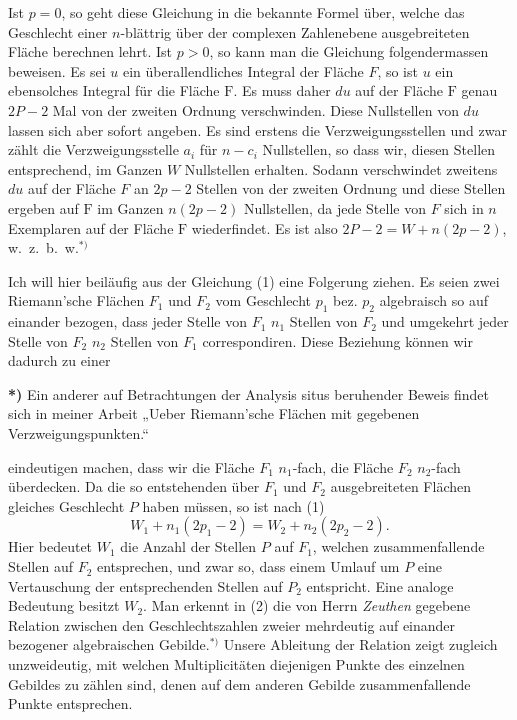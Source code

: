 \documentclass{article}
\begin{document}
Ist $p = 0$, so geht diese Gleichung in die bekannte Formel über, welche das Geschlecht einer $n$-blättrig über der complexen Zahlenebene ausgebreiteten Fläche berechnen lehrt. Ist $p > 0$, so kann man die Gleichung folgendermassen beweisen. Es sei $u$ ein überallendliches Integral der Fläche $F$, so ist $u$ ein ebensolches Integral für die Fläche $\mathrm{F}$. Es muss daher $du$ auf der Fläche $\mathrm{F}$ genau $2P - 2$ Mal von der zweiten Ordnung verschwinden. Diese Nullstellen von $du$ lassen sich aber sofort angeben. Es sind erstens die Verzweigungsstellen und zwar zählt die Verzweigungsstelle $a_i$ für $n - c_i$ Nullstellen, so dass wir, diesen Stellen entsprechend, im Ganzen $W$ Nullstellen erhalten. Sodann verschwindet zweitens $du$ auf der Fläche $F$ an $2p - 2$ Stellen von der zweiten Ordnung und diese Stellen ergeben auf $\mathrm{F}$ im Ganzen $n(2p - 2)$ Nullstellen, da jede Stelle von $F$ sich in $n$ Exemplaren auf der Fläche $\mathrm{F}$ wiederfindet. Es ist also $2P - 2 = W + n(2p - 2)$, w.~z.~b.~w.${}^{*)}$

Ich will hier beiläufig aus der Gleichung (1) eine Folgerung ziehen. Es seien zwei Riemann'sche Flächen $F_1$ und $F_2$ vom Geschlecht $p_1$ bez. $p_2$ algebraisch so auf einander bezogen, dass jeder Stelle von $F_1$ $n_1$ Stellen von $F_2$ und umgekehrt jeder Stelle von $F_2$ $n_2$ Stellen von $F_1$ correspondiren. Diese Beziehung können wir dadurch zu einer

\textbf{*)} Ein anderer auf Betrachtungen der Analysis situs beruhender Beweis findet sich in meiner Arbeit „Ueber Riemann'sche Flächen mit gegebenen Verzweigungspunkten.“

eindeutigen machen, dass wir die Fläche $F_1$ $n_1$-fach, die Fläche $F_2$ $n_2$-fach überdecken. Da die so entstehenden über $F_1$ und $F_2$ ausgebreiteten Flächen gleiches Geschlecht $P$ haben müssen, so ist nach (1)
\[
W_1 + n_1(2p_1 - 2) = W_2 + n_2(2p_2 - 2).
\tag{2}
\]
Hier bedeutet $W_1$ die Anzahl der Stellen $P$ auf $F_1$, welchen zusammenfallende Stellen auf $F_2$ entsprechen, und zwar so, dass einem Umlauf um $P$ eine Vertauschung der entsprechenden Stellen auf $P_2$ entspricht. Eine analoge Bedeutung besitzt $W_2$. Man erkennt in (2) die von Herrn \emph{Zeuthen} gegebene Relation zwischen den Geschlechtszahlen zweier mehrdeutig auf einander bezogener algebraischen Gebilde.${}^{*)}$ Unsere Ableitung der Relation zeigt zugleich unzweideutig, mit welchen Multiplicitäten diejenigen Punkte des einzelnen Gebildes zu zählen sind, denen auf dem anderen Gebilde zusammenfallende Punkte entsprechen.
\end{document}
